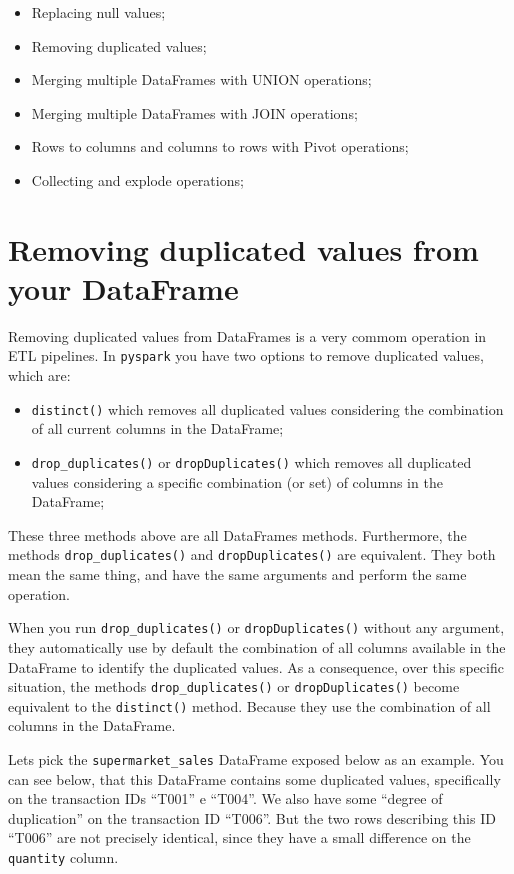 \documentclass[
  11pt,
  letterpaper,
  DIV=11,
  numbers=noendperiod]{scrreprt}
\providecommand{\tightlist}{%
  \setlength{\itemsep}{0pt}\setlength{\parskip}{0pt}}\usepackage{longtable,booktabs,array}
\begin{document}
\begin{itemize}
\tightlist
\item
  Replacing null values;
\item
  Removing duplicated values;
\item
  Merging multiple DataFrames with UNION operations;
\item
  Merging multiple DataFrames with JOIN operations;
\item
  Rows to columns and columns to rows with Pivot operations;
\item
  Collecting and explode operations;
\end{itemize}

\section{Removing duplicated values from your
DataFrame}\label{sec-remove-duplicates}

Removing duplicated values from DataFrames is a very commom operation in
ETL pipelines. In \texttt{pyspark} you have two options to remove
duplicated values, which are:

\begin{itemize}
\tightlist
\item
  \texttt{distinct()} which removes all duplicated values considering
  the combination of all current columns in the DataFrame;
\item
  \texttt{drop\_duplicates()} or \texttt{dropDuplicates()} which removes
  all duplicated values considering a specific combination (or set) of
  columns in the DataFrame;
\end{itemize}

These three methods above are all DataFrames methods. Furthermore, the
methods \texttt{drop\_duplicates()} and \texttt{dropDuplicates()} are
equivalent. They both mean the same thing, and have the same arguments
and perform the same operation.

When you run \texttt{drop\_duplicates()} or \texttt{dropDuplicates()}
without any argument, they automatically use by default the combination
of all columns available in the DataFrame to identify the duplicated
values. As a consequence, over this specific situation, the methods
\texttt{drop\_duplicates()} or \texttt{dropDuplicates()} become
equivalent to the \texttt{distinct()} method. Because they use the
combination of all columns in the DataFrame.

Lets pick the \texttt{supermarket\_sales} DataFrame exposed below as an
example. You can see below, that this DataFrame contains some duplicated
values, specifically on the transaction IDs ``T001'' e ``T004''. We also
have some ``degree of duplication'' on the transaction ID ``T006''. But
the two rows describing this ID ``T006'' are not precisely identical,
since they have a small difference on the \texttt{quantity} column.
\end{document}
